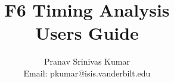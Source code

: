 \documentclass[a4paper,twoside,10pt]{report}
\begin{document}
\title{F6 Timing Analysis \\ Users Guide}
\author{Pranav Srinivas Kumar \\ Email: pkumar@isis.vanderbilt.edu}
\maketitle
\tableofcontents





\end{document}

